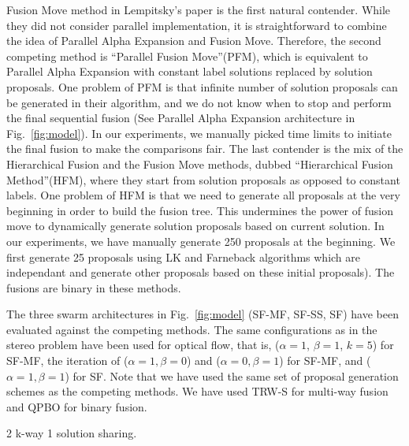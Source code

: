 \noindent Fusion Move method in Lempitsky's paper is the first natural
contender. While they did not consider parallel implementation, it is
straightforward to combine the idea of Parallel Alpha Expansion and
Fusion Move. Therefore, the second competing method is ``Parallel Fusion
Move''(PFM), which is equivalent to Parallel Alpha Expansion with constant
label solutions replaced by solution proposals.
%
One problem of PFM is that infinite number of solution proposals can be
generated in their algorithm, and we do not know when to stop and
perform the final sequential fusion (See Parallel Alpha Expansion
architecture in Fig.~\ref{fig:model}). In our experiments, we manually
picked time limits to initiate the final fusion to make the comparisons
fair.
%
The last contender is the mix of the Hierarchical Fusion and the Fusion
Move methods, dubbed ``Hierarchical Fusion Method''(HFM), where they
start from solution proposals as opposed to constant labels. One problem
of HFM is that we need to generate all proposals at the very beginning in order to build the fusion tree. This undermines the power of fusion move to dynamically generate solution proposals based on current solution. In
our experiments, we have manually generate 250 proposals at the beginning. We first generate 25 proposals using LK and Farneback algorithms which are independant and generate other proposals based on these initial proposals). The fusions are binary in these methods. %


\noindent
The three swarm architectures in Fig.~\ref{fig:model} (SF-MF, SF-SS, SF)
have been evaluated against the competing methods. The same
configurations as in the stereo problem have been used for optical flow,
that is, ($\alpha=1$, $\beta=1$, $k=5$) for SF-MF, the iteration of
($\alpha=1, \beta=0$) and ($\alpha=0, \beta=1$) for SF-MF, and
($\alpha=1, \beta=1$)  for SF.
%
Note that we have used the same set of proposal generation schemes as
the competing methods. We have used TRW-S for multi-way fusion and QPBO
for binary fusion. 
%

2 k-way 1 solution sharing. 
